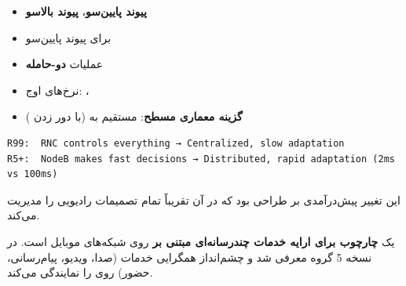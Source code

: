 \begin{itemize}
\tightlist
\item
  \textbf{ پیوند پایین‌سو}، \textbf{ پیوند بالاسو}
\item
   برای پیوند پایین‌سو
\item
  عملیات \textbf{دو-حامله} 
\item
  نرخ‌های اوج: ، 
\item
  \textbf{گزینه معماری مسطح}:  مستقیم به  (با دور زدن )
\end{itemize}


\def\CNcodelang{}

\begin{CNplaincode}
\begin{Verbatim}
R99:  RNC controls everything → Centralized, slow adaptation
R5+:  NodeB makes fast decisions → Distributed, rapid adaptation (2ms vs 100ms)
\end{Verbatim}
\end{CNplaincode}

این تغییر پیش‌درآمدی بر طراحی  بود که در آن  تقریباً تمام تصمیمات رادیویی را مدیریت می‌کند.



\CNchained{}

 یک \textbf{چارچوب برای ارایه خدمات چندرسانه‌ای مبتنی بر } روی شبکه‌های موبایل است. در نسخه 5 گروه  معرفی شد و چشم‌انداز همگرایی  خدمات (صدا، ویدیو، پیام‌رسانی، حضور) روی  را نمایندگی می‌کند.



